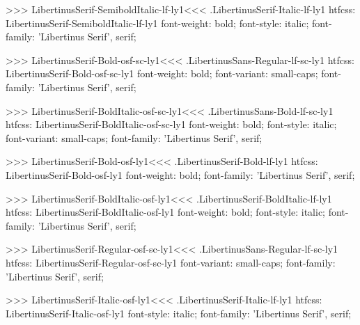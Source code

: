 >>>
\<LibertinusSerif-SemiboldItalic-lf-ly1\><<<
.LibertinusSerif-Italic-lf-ly1
htfcss:  LibertinusSerif-SemiboldItalic-lf-ly1  font-weight: bold; font-style: italic; font-family: 'Libertinus Serif', serif;

>>>
\<LibertinusSerif-Bold-osf-sc-ly1\><<<
.LibertinusSans-Regular-lf-sc-ly1
htfcss:  LibertinusSerif-Bold-osf-sc-ly1  font-weight: bold; font-variant: small-caps; font-family: 'Libertinus Serif', serif;

>>>
\<LibertinusSerif-BoldItalic-osf-sc-ly1\><<<
.LibertinusSans-Bold-lf-sc-ly1
htfcss:  LibertinusSerif-BoldItalic-osf-sc-ly1  font-weight: bold; font-style: italic; font-variant: small-caps; font-family: 'Libertinus Serif', serif;

>>>
\<LibertinusSerif-Bold-osf-ly1\><<<
.LibertinusSerif-Bold-lf-ly1
htfcss:  LibertinusSerif-Bold-osf-ly1  font-weight: bold; font-family: 'Libertinus Serif', serif;

>>>
\<LibertinusSerif-BoldItalic-osf-ly1\><<<
.LibertinusSerif-BoldItalic-lf-ly1
htfcss:  LibertinusSerif-BoldItalic-osf-ly1  font-weight: bold; font-style: italic; font-family: 'Libertinus Serif', serif;

>>>
\<LibertinusSerif-Regular-osf-sc-ly1\><<<
.LibertinusSans-Regular-lf-sc-ly1
htfcss:  LibertinusSerif-Regular-osf-sc-ly1  font-variant: small-caps; font-family: 'Libertinus Serif', serif;

>>>
\<LibertinusSerif-Italic-osf-ly1\><<<
.LibertinusSerif-Italic-lf-ly1
htfcss:  LibertinusSerif-Italic-osf-ly1  font-style: italic; font-family: 'Libertinus Serif', serif;

